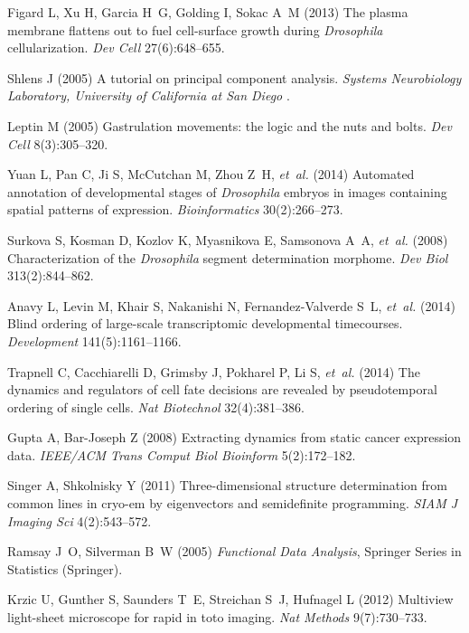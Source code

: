 \documentclass{pnastwo}
\begin{document}
\begin{article}
\begin{thebibliography}{10}
Figard L, Xu H, Garcia H~G, Golding I, Sokac A~M (2013) The plasma membrane
  flattens out to fuel cell-surface growth during \textit{{D}rosophila}
  cellularization. \textit{Dev Cell} 27(6):648--655.

Shlens J (2005) A tutorial on principal component analysis. \textit{Systems
  Neurobiology Laboratory, University of California at San Diego} .

Leptin M (2005) Gastrulation movements: the logic and the nuts and bolts.
  \textit{Dev Cell} 8(3):305--320.

Yuan L, Pan C, Ji S, McCutchan M, Zhou Z~H, \textit{et~al.} (2014) Automated
  annotation of developmental stages of \textit{{D}rosophila} embryos in images
  containing spatial patterns of expression. \textit{Bioinformatics}
  30(2):266--273.

Surkova S, Kosman D, Kozlov K, Myasnikova E, Samsonova A~A, \textit{et~al.}
  (2008) Characterization of the \textit{{D}rosophila} segment determination
  morphome. \textit{Dev Biol} 313(2):844--862.

Anavy L, Levin M, Khair S, Nakanishi N, Fernandez-Valverde S~L, \textit{et~al.}
  (2014) Blind ordering of large-scale transcriptomic developmental
  timecourses. \textit{Development} 141(5):1161--1166.

Trapnell C, Cacchiarelli D, Grimsby J, Pokharel P, Li S, \textit{et~al.} (2014)
  The dynamics and regulators of cell fate decisions are revealed by
  pseudotemporal ordering of single cells. \textit{Nat Biotechnol} 32(4):381--386.

Gupta A, Bar-Joseph Z (2008) Extracting dynamics from static cancer expression
  data. \textit{IEEE/ACM Trans Comput Biol Bioinform} 5(2):172--182.

Singer A, Shkolnisky Y (2011) Three-dimensional structure determination from
  common lines in cryo-em by eigenvectors and semidefinite programming.
  \textit{SIAM J Imaging Sci} 4(2):543--572.

Ramsay J~O, Silverman B~W (2005) \textit{Functional Data Analysis}, Springer
  Series in Statistics (Springer).

Krzic U, Gunther S, Saunders T~E, Streichan S~J, Hufnagel L (2012) Multiview
  light-sheet microscope for rapid in toto imaging. \textit{Nat Methods}
  9(7):730--733.


\end{thebibliography}
\end{article}
\end{document}
